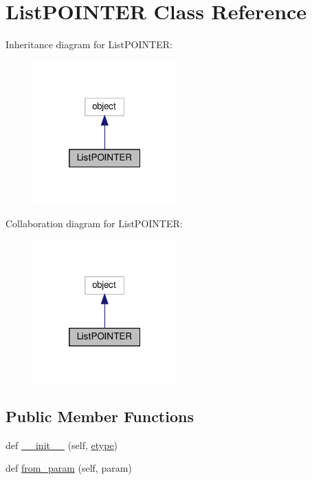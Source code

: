\hypertarget{classvlc_1_1_list_p_o_i_n_t_e_r}{}\section{List\+P\+O\+I\+N\+T\+ER Class Reference}
\label{classvlc_1_1_list_p_o_i_n_t_e_r}


Inheritance diagram for List\+P\+O\+I\+N\+T\+ER\+:
\nopagebreak
\begin{figure}[H]
\begin{center}
\leavevmode
\includegraphics[width=157pt]{classvlc_1_1_list_p_o_i_n_t_e_r__inherit__graph}
\end{center}
\end{figure}


Collaboration diagram for List\+P\+O\+I\+N\+T\+ER\+:
\nopagebreak
\begin{figure}[H]
\begin{center}
\leavevmode
\includegraphics[width=157pt]{classvlc_1_1_list_p_o_i_n_t_e_r__coll__graph}
\end{center}
\end{figure}
\subsection*{Public Member Functions}
\begin{DoxyCompactItemize}
\item 
def \hyperlink{classvlc_1_1_list_p_o_i_n_t_e_r_a26393747be6afa8ac347099f7fe4bc9c}{\+\_\+\+\_\+init\+\_\+\+\_\+} (self, \hyperlink{classvlc_1_1_list_p_o_i_n_t_e_r_ac771a20ee94453196998b6165dda15b3}{etype})
\item 
def \hyperlink{classvlc_1_1_list_p_o_i_n_t_e_r_acfdaf9d0a20d3fd0e7e16ea1750abb7d}{from\+\_\+param} (self, param)
\end{DoxyCompactItemize}
